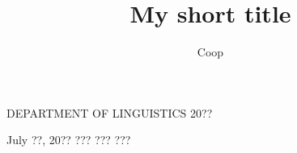 \documentclass[dissertation,CC-BY-ND,notoc,openany]{tufte-book}
\title{My short title}
\author{Coop}
\begin{document}
\begin{fullwidth}
\maketitlepage
{DEPARTMENT OF LINGUISTICS}	%
{20??}

\approval
{July ??, 20??}		%
{???}		%
{???}    %
{???}	%
{} %
{} %

\statementbyauthor %



\tableofcontents

\listoffigures

\listoftables


\end{fullwidth}







\appendix
%


\backmatter
\begin{fullwidth}
\let\clearpage\relax

\end{fullwidth}
\end{document}
